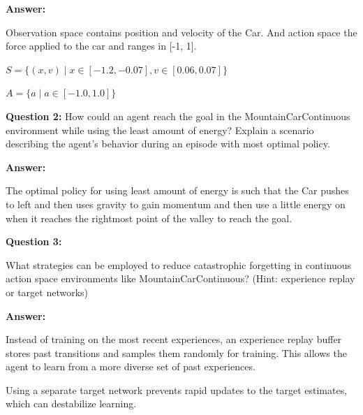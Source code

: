 \documentclass[12pt]{article}
\begin{document}
{{{{\textbf{Answer:}

Observation space contains position and velocity of the Car. And action space the force applied to the car and ranges in [-1, 1].

$S=\{(x,v)∣x∈[−1.2, -0.07],v∈[0.06, 0.07]\}$

$A=\{a∣a∈[−1.0,1.0]\}$

\textbf{Question 2:}
How could an agent reach the goal in the MountainCarContinuous environment while using the least amount of energy? Explain a scenario describing the agent’s behavior during an episode with most optimal policy.

\textbf{Answer:}

The optimal policy for using least amount of energy is such that the Car pushes to left and then uses gravity to gain momentum and then use a little energy on when it reaches the rightmost point of the valley to reach the goal.

\textbf{Question 3:}

What strategies can be employed to reduce catastrophic forgetting in continuous action space environments like MountainCarContinuous? (Hint: experience replay or target networks)

\textbf{Answer:}

Instead of training on the most recent experiences, an experience replay buffer stores past transitions and samples them randomly for training. This allows the agent to learn from a more diverse set of past experiences.

Using a separate target network prevents rapid updates to the target estimates, which can destabilize learning.
}}




\newpage

{}}}
\end{document}
